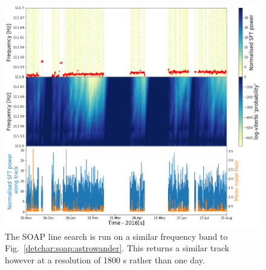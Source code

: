 %
\begin{figure}
	\centering
	\includegraphics[width=\textwidth]{C5_detchar/track_F111_5_111_7_wander_2.png}
	\caption[Example SOAP output for wandering line]{The SOAP line search is run on a similar frequency band to Fig.~\ref{detchar:soap:astrowander}. This returns a similar track however at a resolution of 1800 s rather than one day.}
	\label{detchar:soap:linewander}
\end{figure}
%

